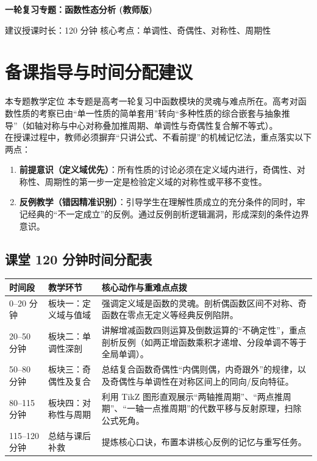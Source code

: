 \documentclass[11pt,a4paper]{ctexart}
\begin{document}
\begin{center}
  {\LARGE\bfseries 一轮复习专题：函数性态分析 \quad (教师版)}\par
  \vspace{0.8em}
  {\small 建议授课时长：120 分钟 \quad 核心考点：单调性、奇偶性、对称性、周期性}
\end{center}
\vspace{0.6em}

\section{备课指导与时间分配建议}

\begin{teachbox}{本专题教学定位}
  本专题是高考一轮复习中函数模块的灵魂与难点所在。高考对函数性质的考察已由“单一性质的简单套用”转向“多种性质的综合嵌套与抽象推导”（如轴对称与中心对称叠加推周期、单调性与奇偶性复合解不等式）。\\
  在授课过程中，教师必须摒弃“只讲公式、不看前提”的机械记忆法，重点落实以下两点：
  \begin{enumerate}
    \item \textbf{前提意识（定义域优先）}：所有性质的讨论必须在定义域内进行，奇偶性、对称性、周期性的第一步一定是检验定义域的对称性或平移不变性。
    \item \textbf{反例教学（错因精准识别）}：引导学生在理解性质成立的充分条件的同时，牢记经典的“不一定成立”的反例。通过反例剖析逻辑漏洞，形成深刻的条件边界意识。
  \end{enumerate}
\end{teachbox}

\subsection*{课堂 120 分钟时间分配表}
\begin{tabularx}{\textwidth}{p{2.2cm}p{3.0cm}X}
\toprule
时间段 & 教学环节 & 核心动作与重难点点拨\\
\midrule
0--20 分钟 & 板块一：定义域与值域 & 强调定义域是函数的灵魂。剖析偶函数区间不对称、奇函数在零点无定义等经典反例陷阱。\\ \hline
20--50 分钟 & 板块二：单调性深剖 & 讲解增减函数四则运算及倒数运算的“不确定性”，重点剖析反例（如两正增函数乘积才递增、分段单调不等于全局单调）。\\ \hline
50--80 分钟 & 板块三：奇偶性及复合 & 总结复合函数奇偶性“内偶则偶，内奇跟外”的规律，以及奇偶性与单调性在对称区间上的同向/反向特征。\\ \hline
80--115 分钟 & 板块四：对称性与周期 & 利用 TikZ 图形直观展示“两轴推周期”、“两点推周期”、“一轴一点推周期”的代数平移与反射原理，扫除公式死角。\\ \hline
115--120 分钟 & 总结与课后补救 & 提炼核心口诀，布置本讲核心反例的记忆与重写任务。\\
\bottomrule
\end{tabularx}
\end{document}
